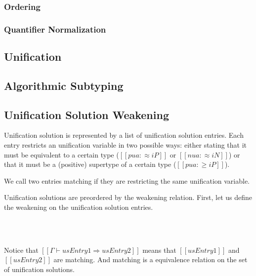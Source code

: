\documentclass[a4,natbib=false]{article}
\begin{document}
\subsubsection{Ordering}
\ottdefnsOrder

\subsubsection{Quantifier Normalization}
\ottdefnsNrm


\subsection{Unification}
\ottdefnsU

\subsection{Algorithmic Subtyping}
\ottdefnsA

\subsection{Unification Solution Weakening}

Unification solution is represented by a list of unification solution entries.
Each entry restricts an unification variable in two possible ways: either
stating that it must be equivalent to a certain type ($[[pua :≈ iP]]$ or $[[nua
:≈ iN]]$) or that it must be a (positive) supertype of a certain type ($[[pua :≥ iP]]$).

\begin{definition} 
  We call two entries matching if they are restricting the same unification variable.
\end{definition}

Unification solutions are preordered by the weakening relation.
First, let us define the weakening on the unification solution entries.\\

\begin{definition} \hfill \\
\ottdefnSImpE{}\\
\end{definition}
Notice that  $[[Γ ⊢ usEntry1 ⇒ usEntry2]]$ means that $[[usEntry1]]$ and $[[usEntry2]]$ are matching. And 
matching is a equivalence relation on the set of unification solutions. 
\end{document}
